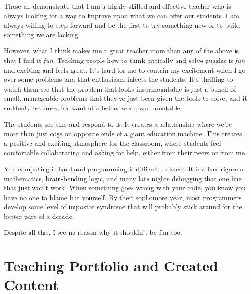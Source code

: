 \documentclass[10pt]{article}
\begin{document}

These all demonstrate that I am a highly skilled and effective teacher who is always looking for a way to improve upon what we can offer our students. I am always willing to step forward and be the first to try something new or to build something we are lacking.

However, what I think makes me a great teacher more than any of the above is that I find it \textit{fun}.  
Teaching people how to think critically and solve puzzles is \textit{fun} and exciting and feels great.
It's hard for me to contain my excitement when I go  over some problems and that enthusiasm infects the students.
It's thrilling to watch them see that the problem that looks insurmountable is just a bunch of small, manageable problems that they've just been given the tools to solve,  and it suddenly becomes, for want of a better word, surmountable.


The students see this and respond to it.
It creates a relationship where we're more than just cogs on opposite ends of a giant education machine.
This creates a positive and exciting atmosphere for the classroom, where students feel comfortable collaborating and asking for help, either from their peers or from me.


Yes, computing is hard and programming is difficult to learn.
It involves rigorous mathematics, brain-bending logic, and many late nights debugging that one line that just won't work.
When something goes wrong with your code, you know you have no one to blame but yourself.
By their sophomore year, most programmers develop some level of impostor syndrome that will probably  stick around for the better part of a decade. 

Despite all this, I see no reason why it shouldn't be fun too.


%
%


\section{Teaching Portfolio and Created Content}
\end{document}
